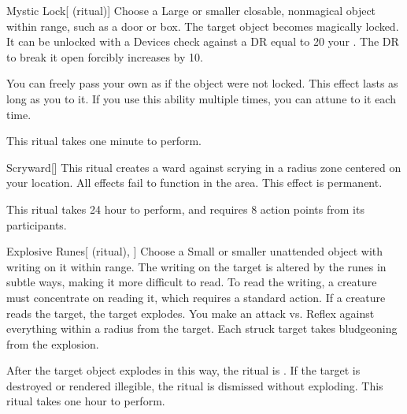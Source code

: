 \lowercase{\hypertarget{spell:Mystic Lock}{}}\label{spell:Mystic Lock}
\begin{attuneability}[\nth{2}]{\hypertarget{spell:Mystic Lock}{Mystic Lock}}[ (ritual)]
Choose a Large or smaller closable, nonmagical object within \rngclose range, such as a door or box.
The target object becomes magically locked.
It can be unlocked with a Devices check against a DR equal to 20 \add your .
The DR to break it open forcibly increases by 10.

You can freely pass your own  as if the object were not locked.
This effect lasts as long as you  to it.
If you use this ability multiple times, you can attune to it each time.

This ritual takes one minute to perform.
\end{attuneability}
\vspace{0.25em}



\lowercase{\hypertarget{spell:Scryward}{}}\label{spell:Scryward}
\begin{apability}[\nth{2}]{\hypertarget{spell:Scryward}{Scryward}}[]
This ritual creates a ward against scrying in a \arealarge radius zone centered on your location.
All  effects fail to function in the area.
This effect is permanent.

This ritual takes 24 hour to perform, and requires 8 action points from its participants.
\end{apability}
\vspace{0.25em}



\lowercase{\hypertarget{spell:Explosive Runes}{}}\label{spell:Explosive Runes}
\begin{attuneability}[\nth{3}]{\hypertarget{spell:Explosive Runes}{Explosive Runes}}[ (ritual), ]
Choose a Small or smaller unattended object with writing on it within \rngclose range.
The writing on the target is altered by the runes in subtle ways, making it more difficult to read.
To read the writing, a creature must concentrate on reading it, which requires a standard action.
If a creature reads the target, the target explodes.
You make an attack vs. Reflex against everything within a \areamed radius from the target.
Each struck target takes bludgeoning  from the explosion.

After the target object explodes in this way, the ritual is .
If the target is destroyed or rendered illegible, the ritual is dismissed without exploding.
This ritual takes one hour to perform.
\end{attuneability}
\vspace{0.25em}




